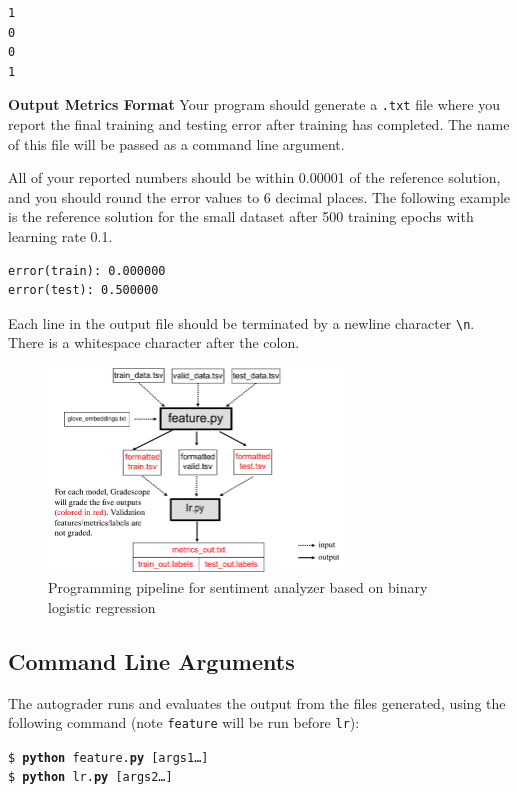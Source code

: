 \documentclass[11pt,addpoints,answers]{exam}
\begin{document}
\begin{lstlisting}
1
0
0
1
\end{lstlisting}

{\bf Output Metrics Format }
Your program should generate a \texttt{.txt} file where you report the final training and testing error after training has completed. The name of this file will be passed as a command line argument.

All of your reported numbers should be within 0.00001 of the reference solution, and you should round the error values to 6 decimal places. The following example is the reference solution for the small dataset after 500 training epochs with learning rate 0.1.
\begin{lstlisting}
error(train): 0.000000
error(test): 0.500000
\end{lstlisting}

Each line in the output file should be terminated by a newline character \lstinline{\n}. There is a whitespace character after the colon.

\begin{figure}[H]
        \centering
        \includegraphics[width = 0.7\textwidth]{fig/Pipeline_v5.png}
        \caption{Programming pipeline for sentiment analyzer based on binary logistic regression}
        \label{pipeline}
\end{figure}

\subsection{Command Line Arguments}\label{commandline}
The autograder runs and evaluates the output from the files generated, using the following command (note \lstinline{feature} will be run before \lstinline{lr}):

\begin{tabbing}
\=\texttt{\$ \textbf{python} feature.\textbf{py} [args1\dots]}\\
\>\texttt{\$ \textbf{python} lr.\textbf{py} [args2\dots]}
\end{tabbing}
\end{document}
